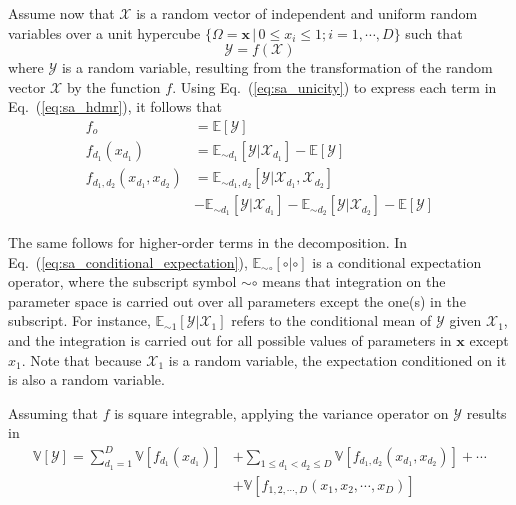 Assume now that $\bm{\mathcal{X}}$ is a random vector of independent and uniform random variables over a unit hypercube
$\{\Omega = \bm{x} \, | \, 0 \leq x_i  \leq 1; i = 1,\cdots, D\}$ such that
\begin{equation}
	\mathcal{Y} = f(\bm{\mathcal{X}})
\label{eq:sa_random_function}
\end{equation}
where $\mathcal{Y}$ is a random variable, resulting from the transformation of the random vector $\bm{\mathcal{X}}$ by the function $f$.
Using Eq.~(\ref{eq:sa_unicity}) to express each term in Eq.~(\ref{eq:sa_hdmr}), it follows that
\begin{equation}
	\begin{split}
		f_o & = \mathbb{E}[\mathcal{Y}] \\
	  f_{d_1}(x_{d_1}) & = \mathbb{E}_{\sim d_1}[\mathcal{Y}|\mathcal{X}_{d_1}] - \mathbb{E}[\mathcal{Y}]\\
    f_{d_1,d_2}(x_{d_1},x_{d_2}) & = \mathbb{E}_{\sim d_1,d_2} [\mathcal{Y}|\mathcal{X}_{d_1}, \mathcal{X}_{d_2}] \\
																 & - \mathbb{E}_{\sim d_1}[\mathcal{Y}|\mathcal{X}_{d_1}] - \mathbb{E}_{\sim d_2}[\mathcal{Y}|\mathcal{X}_{d_2}] - \mathbb{E}[\mathcal{Y}] 
	\end{split}
\label{eq:sa_conditional_expectation}
\end{equation}

The same follows for higher-order terms in the decomposition. 
In Eq.~(\ref{eq:sa_conditional_expectation}),
$\mathbb{E}_{\sim \circ} [\circ|\circ]$ is a conditional expectation operator,
where the subscript symbol $\sim\circ$ means that integration on the parameter space is carried out over all parameters except the one(s) in the subscript.
For instance, $\mathbb{E}_{\sim 1} [\mathcal{Y}|\mathcal{X}_1]$ refers to the conditional mean of $\mathcal{Y}$ given $\mathcal{X}_1$, and the integration is carried out for all possible values of parameters in $\mathbf{x}$ except $x_1$.
Note that because $\mathcal{X}_1$ is a random variable, the expectation conditioned on it is also a random variable.

Assuming that $f$ is square integrable, applying the variance operator on $\mathcal{Y}$ results in
\begin{equation}
	\begin{split}
		\mathbb{V}[\mathcal{Y}] = \sum_{d_1=1}^{D} \mathbb{V}[f_{d_1} (x_{d_1})] & + \sum_{1 \leq d_1 < d_2 \leq D} \mathbb{V} [f_{d_1,d_2} (x_{d_1}, x_{d_2})] + \cdots \\
	                                                       & + \mathbb{V} [f_{1,2,\cdots,D} (x_1, x_2, \cdots, x_D)]
		\end{split}
\label{eq:sa_variance_decomposition}
\end{equation}

